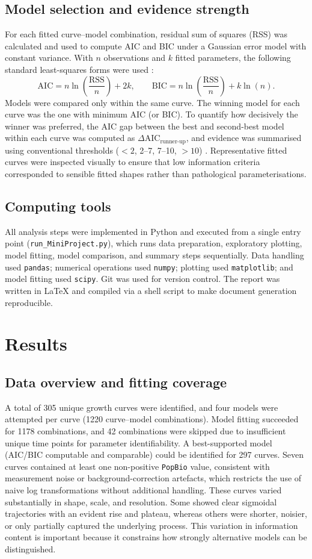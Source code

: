\documentclass[11pt]{article}
\begin{document}
\subsection*{Model selection and evidence strength}
For each fitted curve--model combination, residual sum of squares (RSS) was calculated and used to compute AIC and BIC under a Gaussian error model with constant variance. With \(n\) observations and \(k\) fitted parameters, the following standard least-squares forms were used \citep{Akaike1974,Schwarz1978}:
\[
\mathrm{AIC} = n\ln\left(\frac{\mathrm{RSS}}{n}\right) + 2k,
\qquad
\mathrm{BIC} = n\ln\left(\frac{\mathrm{RSS}}{n}\right) + k\ln(n).
\]
Models were compared only within the same curve. The winning model for each curve was the one with minimum AIC (or BIC). To quantify how decisively the winner was preferred, the AIC gap between the best and second-best model within each curve was computed as \(\Delta\)AIC\(_{\text{runner-up}}\), and evidence was summarised using conventional thresholds (\(<2\), 2--7, 7--10, \(>10\)) \citep{BurnhamAnderson2002}. Representative fitted curves were inspected visually to ensure that low information criteria corresponded to sensible fitted shapes rather than pathological parameterisations.
\subsection*{Computing tools}
All analysis steps were implemented in Python and executed from a single entry point (\texttt{run\_MiniProject.py}), which runs data preparation, exploratory plotting, model fitting, model comparison, and summary steps sequentially. Data handling used \texttt{pandas}; numerical operations used \texttt{numpy}; plotting used \texttt{matplotlib}; and model fitting used \texttt{scipy}. Git was used for version control. The report was written in \LaTeX{} and compiled via a shell script to make document generation reproducible.
\section*{Results}
\subsection*{Data overview and fitting coverage}
A total of 305 unique growth curves were identified, and four models were attempted per curve (1220 curve--model combinations). Model fitting succeeded for 1178 combinations, and 42 combinations were skipped due to insufficient unique time points for parameter identifiability. A best-supported model (AIC/BIC computable and comparable) could be identified for 297 curves. Seven curves contained at least one non-positive \texttt{PopBio} value, consistent with measurement noise or background-correction artefacts, which restricts the use of naive log transformations without additional handling.
These curves varied substantially in shape, scale, and resolution. Some showed clear sigmoidal trajectories with an evident rise and plateau, whereas others were shorter, noisier, or only partially captured the underlying process. This variation in information content is important because it constrains how strongly alternative models can be distinguished.
\end{document}
